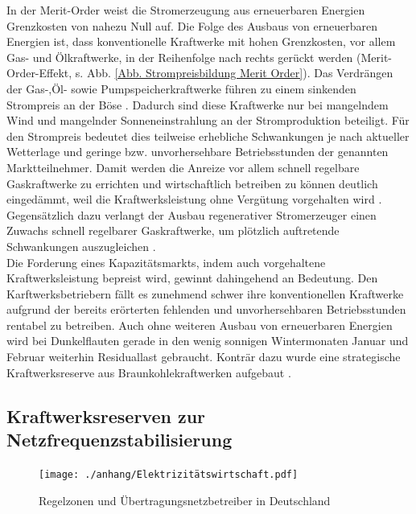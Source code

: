 		In der Merit-Order weist die Stromerzeugung aus erneuerbaren Energien Grenzkosten von nahezu Null auf.
		Die Folge des Ausbaus von erneuerbaren Energien ist, dass konventionelle Kraftwerke mit hohen Grenzkosten, vor allem Gas- und Ölkraftwerke, in der Reihenfolge nach rechts gerückt werden (Merit-Order-Effekt, s. Abb. \ref{Abb. Strompreisbildung Merit Order}).
		Das Verdrängen der Gas-,Öl- sowie Pumpspeicherkraftwerke führen zu einem sinkenden Strompreis an der Böse \parencite{Frauenhofer_PV_Bericht}.
		Dadurch sind diese Kraftwerke nur bei mangelndem Wind und mangelnder Sonneneinstrahlung an der Stromproduktion beteiligt.
		Für den Strompreis bedeutet dies teilweise erhebliche Schwankungen je nach aktueller Wetterlage und geringe bzw. unvorhersehbare Betriebsstunden der genannten Marktteilnehmer. 
		Damit werden die Anreize vor allem schnell regelbare Gaskraftwerke zu errichten und wirtschaftlich betreiben zu können deutlich eingedämmt, weil die Kraftwerksleistung ohne Vergütung vorgehalten wird \parencite{Frauenhofer_PV_Bericht}.
		Gegensätzlich dazu verlangt der Ausbau regenerativer Stromerzeuger einen Zuwachs schnell regelbarer Gaskraftwerke, um plötzlich auftretende Schwankungen auszugleichen \parencite{Doktorarbeit_Reitsam}. \\
		
		Die Forderung eines Kapazitätsmarkts, indem auch vorgehaltene Kraftwerksleistung bepreist wird, gewinnt dahingehend an Bedeutung.
		Den Karftwerksbetriebern fällt es zunehmend schwer ihre konventionellen Kraftwerke aufgrund der bereits erörterten fehlenden und unvorhersehbaren Betriebsstunden rentabel zu betreiben.
		Auch ohne weiteren Ausbau von erneuerbaren Energien wird bei Dunkelflauten gerade in den wenig sonnigen Wintermonaten Januar und Februar weiterhin Residuallast gebraucht.
		Konträr dazu wurde eine strategische Kraftwerksreserve aus Braunkohlekraftwerken aufgebaut \parencite{bbh_blog}.		
				
	\subsection{Kraftwerksreserven zur Netzfrequenzstabilisierung}
	
		\begin{figure}
			\centering
			\texttt{[image: ./anhang/Elektrizitätswirtschaft.pdf]}
			\caption{Regelzonen und Übertragungsnetzbetreiber in Deutschland \parencite{Elektrizitätswirtschaft}}
			\label{Abb. Regelzonen Deutschland}
		\end{figure}
	
